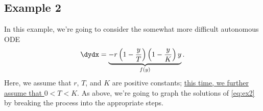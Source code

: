 \documentclass[12pt]{article}
\theoremstyle{definition}
\theoremstyle{underl}
\begin{document}
	\newpage
	

	\subsection*{Example 2}
	In this example, we're going to consider the somewhat more difficult autonomous ODE
	\begin{equation}
		\label{eq:ex2}
		\dydx = \underbrace{-r\left(1-\frac{y}{T}\right)\left(1-\frac{y}{K}\right) y}_{f(y)}.
	\end{equation}
	Here, we assume that $r$, $T$, and $K$ are positive constants; \ul{this time, we further assume that $0<T<K$}. As above, we're going to graph the solutions of \eqref{eq:ex2} by breaking the process into the appropriate steps.
	
\end{document}
